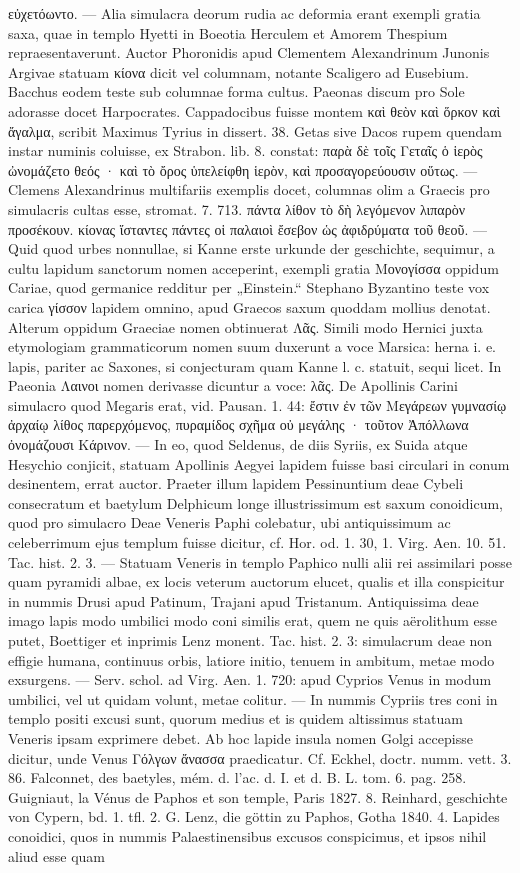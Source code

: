 \documentclass[a4paper, 11pt, oneside, polutonikogreek, german]{article}
\begin{document}
εὐχετόωντο. --- Alia simulacra deorum rudia ac deformia erant exempli gratia saxa, quae in templo Hyetti in Boeotia Herculem et Amorem Thespium repraesentaverunt. Auctor Phoronidis apud Clementem Alexandrinum Junonis Argivae statuam κίονα dicit vel columnam, notante Scaligero ad Eusebium. Bacchus eodem teste sub columnae forma cultus. Paeonas discum pro Sole adorasse docet Harpocrates. Cappadocibus fuisse montem καὶ θεὸν καὶ ὅρκον καὶ ἄγαλμα, scribit Maximus Tyrius in dissert. 38. Getas sive Dacos rupem quendam instar numinis coluisse, ex Strabon. lib. 8. constat: παρὰ δὲ τοῖς Γεταῖς ὁ ἱερὸς ὠνομάζετο θεός · καὶ τὸ ὄρος ὑπελείφθη ἱερὸν, καὶ προσαγορεύουσιν οὕτως. --- Clemens Alexandrinus multifariis exemplis docet, columnas olim a Graecis pro simulacris cultas esse, stromat. 7. 713. πάντα λίθον τὸ δὴ λεγόμενον λιπαρὸν προσέκουν. κίονας ἵσταντες πάντες οἱ παλαιοὶ ἔσεβον ὡς ἀφιδρύματα τοῦ θεοῦ. --- Quid quod urbes nonnullae, si Kanne erste urkunde der geschichte, sequimur, a cultu lapidum sanctorum nomen acceperint, exempli gratia Μονογίσσα oppidum Cariae, quod germanice redditur per „Einstein.“ Stephano Byzantino teste vox carica γίσσον lapidem omnino, apud Graecos saxum quoddam mollius denotat. Alterum oppidum Graeciae nomen obtinuerat Λᾶς. Simili modo Hernici juxta etymologiam grammaticorum nomen suum duxerunt a voce Marsica: herna i. e. lapis, pariter ac Saxones, si conjecturam quam Kanne l. c. statuit, sequi licet. In Paeonia Λαινοι nomen derivasse dicuntur a voce: λᾶς. De Apollinis Carini simulacro quod Megaris erat, vid. Pausan. 1. 44: ἔστιν ἐν τῶν Μεγάρεων γυμνασίῳ ἀρχαίῳ λίθος παρερχόμενος, πυραμίδος σχῆμα οὐ μεγάλης · τοῦτον Ἀπόλλωνα ὀνομάζουσι Κάρινον. --- In eo, quod Seldenus, de diis Syriis, ex Suida atque Hesychio conjicit, statuam Apollinis Aegyei lapidem fuisse basi circulari in conum desinentem, errat auctor. Praeter illum lapidem Pessinuntium deae Cybeli consecratum et baetylum Delphicum longe illustrissimum est saxum conoidicum, quod pro simulacro Deae Veneris Paphi colebatur, ubi antiquissimum ac celeberrimum ejus templum fuisse dicitur, cf. Hor. od. 1. 30, 1. Virg. Aen. 10. 51. Tac. hist. 2. 3. --- Statuam Veneris in templo Paphico nulli alii rei assimilari posse quam pyramidi albae, ex locis veterum auctorum elucet, qualis et illa conspicitur in nummis Drusi apud Patinum, Trajani apud Tristanum. Antiquissima deae imago lapis modo umbilici modo coni similis erat, quem ne quis aërolithum esse putet, Boettiger et inprimis Lenz monent. Tac. hist. 2. 3: simulacrum deae non effigie humana, continuus orbis, latiore initio, tenuem in ambitum, metae modo exsurgens. --- Serv. schol. ad Virg. Aen. 1. 720: apud Cyprios Venus in modum umbilici, vel ut quidam volunt, metae colitur. --- In nummis Cypriis tres coni in templo positi excusi sunt, quorum medius et is quidem altissimus statuam Veneris ipsam exprimere debet. Ab hoc lapide insula nomen Golgi accepisse dicitur, unde Venus Γόλγων ἄνασσα praedicatur. Cf. Eckhel, doctr. numm. vett. 3. 86. Falconnet, des baetyles, mém. d. l'ac. d. I. et d. B. L. tom. 6. pag. 258. Guigniaut, la Vénus de Paphos et son temple, Paris 1827. 8. Reinhard, geschichte von Cypern, bd. 1. tfl. 2. G. Lenz, die göttin zu Paphos, Gotha 1840. 4. Lapides conoidici, quos in nummis Palaestinensibus excusos conspicimus, et ipsos nihil aliud esse quam 
\end{document}
